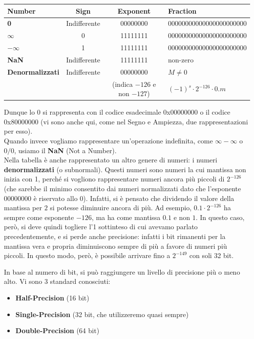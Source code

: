 \documentclass[11pt, a4paper, titlepage, oneside]{scrbook}
\begin{document}
\begin{center}
\begin{tabular}{|l|c|c|l|}
\hline
Number & Sign & Exponent & Fraction \\
\hline
\textbf{0} & Indifferente & 00000000 & 00000000000000000000000 \\
\hline
$\bm{\infty}$ & 0 & 11111111 & 00000000000000000000000 \\
\hline
$\bm{-\infty}$ & 1 & 11111111 & 00000000000000000000000 \\
\hline
\textbf{NaN} & Indifferente & 11111111 & non-zero \\
\hline
\textbf{Denormalizzati} & Indifferente & 00000000& $M \neq 0$ \\
 & &  (indica $-126$ e non $-127$) & $(-1)^s \cdot 2^{-126} \cdot 0.m$ \\
\hline
\end{tabular}
\end{center}

Dunque lo 0 si rappresenta con il codice esadecimale 0x00000000 o il codice 0x80000000 (vi sono anche qui, come nel Segno e Ampiezza, due rappresentazioni per esso). \\
Quando invece vogliamo rappresentare un'operazione indefinita, come $\infty - \infty$ o $0/0$, usiamo il \textbf{NaN} (Not a Number). \\
Nella tabella è anche rappresentato un altro genere di numeri: i numeri \textbf{denormalizzati} (o subnormali). Questi numeri sono numeri la cui mantissa non inizia con 1, perché si vogliono rappresentare numeri ancora più piccoli di $2^{-126}$ (che sarebbe il minimo consentito dai numeri normalizzati dato che l'esponente 00000000 è riservato allo 0). Infatti, si è pensato che dividendo il valore della mantissa per $2$ si potesse diminuire ancora di più. Ad esempio, $0.1 \cdot 2^{-126}$ ha sempre come esponente $-126$, ma ha come mantissa $0.1$ e non $1$. In questo caso, però, si deve quindi togliere l'1 sottinteso di cui avevamo parlato precedentemente, e si perde anche precisione: infatti i bit rimanenti per la mantissa vera e propria diminuiscono sempre di più a favore di numeri più piccoli. In questo modo, però, è possibile arrivare fino a $2^{-149}$ con soli 32 bit.

\begin{Proprieta}
\label{prop-livello-di-precisione}
In base al numero di bit, si può raggiungere un livello di precisione più o meno alto. Vi sono 3 standard conosciuti:
\begin{itemize}
    \item \textbf{Half-Precision} (16 bit)
    \item \textbf{Single-Precision} (32 bit, che utilizzeremo quasi sempre)
    \item \textbf{Double-Precision} (64 bit)
\end{itemize}
\end{Proprieta}
\end{document}

